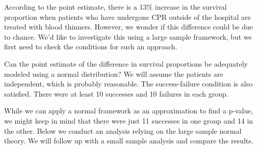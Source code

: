 According to the point estimate, there is a 13\% increase in the survival proportion when patients who have undergone CPR outside of the hospital are treated with blood thinners. However, we wonder if this difference could be due to chance. We'd like to investigate this using a large sample framework, but we first need to check the conditions for such an approach.

\pagebreak

\begin{example}{Can the point estimate of the difference in survival proportions be adequately modeled using a normal distribution?}
We will assume the patients are independent, which is probably reasonable. The success-failure condition is also satisfied. There were at least 10 successes and 10 failures in each group.
\end{example}

While we can apply a normal framework as an approximation to find a p-value, we might keep in mind that there were just 11 successes in one group and 14 in the other. Below we conduct an analysis relying on the large sample normal theory. We will follow up with a small sample analysis and compare the results.

